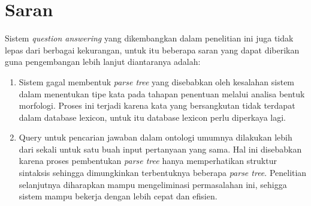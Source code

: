 \section{Saran}
Sistem \emph{question answering} yang dikembangkan dalam penelitian ini juga tidak lepas dari berbagai kekurangan, untuk itu beberapa saran yang dapat diberikan guna pengembangan lebih lanjut diantaranya adalah:
\begin{enumerate}
	\item Sistem gagal membentuk \emph{parse tree} yang disebabkan oleh kesalahan sistem dalam menentukan tipe kata pada tahapan penentuan melalui analisa bentuk morfologi. Proses ini terjadi karena kata yang bersangkutan tidak terdapat dalam database lexicon, untuk itu database lexicon perlu diperkaya lagi.
	\item Query untuk pencarian jawaban dalam ontologi umumnya dilakukan lebih dari sekali untuk satu buah input pertanyaan yang sama. Hal ini disebabkan karena proses pembentukan \emph{parse tree} hanya memperhatikan struktur sintaksis sehingga dimungkinkan terbentuknya beberapa \emph{parse tree}. Penelitian selanjutnya diharapkan mampu mengeliminasi permasalahan ini, sehigga sistem mampu bekerja dengan lebih cepat dan efisien.
\end{enumerate}